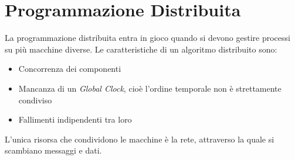 \chapter{Programmazione Distribuita}
La programmazione distribuita entra in gioco quando si devono gestire processi su più macchine diverse. Le caratteristiche di un algoritmo distribuito sono:
\begin{itemize}
\item Concorrenza dei componenti
\item Mancanza di un \textit{Global Clock}, cioè l'ordine temporale non è strettamente condiviso
\item Fallimenti indipendenti tra loro
\end{itemize}
L'unica risorsa che condividono le macchine è la rete, attraverso la quale si scambiano messaggi e dati. 